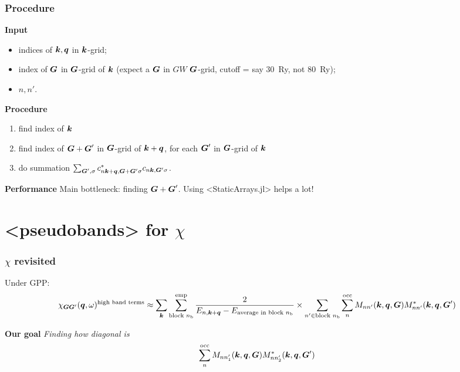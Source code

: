 \documentclass[t]{beamer}
\newcommand{\shortcode}[1]{\texttt{#1}}
\def\\{}%
\def\texttt#1{<#1>}%
\begin{document}
\begin{frame}
\frametitle{Procedure}

\textbf{Input} 
\begin{itemize}
    \item indices of $\vb*{k}, \vb*{q}$ in $\vb*{k}$-grid; 
    \item index of $\vb*{G}$ in $\vb*{G}$-grid of $\vb*{k}$ 
    (expect a $\vb*{G}$ in $GW$ $\vb*{G}$-grid, 
    cutoff = say \SI{30}{Ry}, not \SI{80}{Ry});
    \item $n, n'$.
\end{itemize}

\textbf{Procedure}
\begin{enumerate}
    \item find index of $\vb*{k}$
    \item find index of $\vb*{G} + \vb*{G}'$ in $\vb*{G}$-grid of $\vb*{k} + \vb*{q}$,
    for each $\vb*{G}'$ in $\vb*{G}$-grid of $\vb*{k}$
    \item do summation $\sum_{\vb*{G}', \sigma} c^*_{n \vb*{k} + \vb*{q}, \vb*{G} + \vb*{G}' \sigma} c_{n \vb*{k}, \vb*{G}' \sigma}$.
\end{enumerate}    

\vspace{0.5cm}

\textbf{Performance} Main bottleneck: finding $\vb*{G} + \vb*{G}'$.
Using \shortcode{StaticArrays.jl} helps a lot! 

\end{frame}

\section{\shortcode{pseudobands} for $\chi$}

\begin{frame}
\frametitle{$\chi$ revisited}

Under GPP:
\begin{equation}
    \begin{aligned}
        \chi_{\vb*{G} \vb*{G}'}(\vb*{q}, \omega)^{\text{high band terms}}
        \approx \sum_{\vb*{k}} \sum_{\text{block $n_{\text{b}}$}}^{\text{emp}} 
        \frac{
            2
        }{
            E_{n, \vb*{k} + \vb*{q}} - E_{\text{average in block $n_{\text{b}}$}} 
        } \\
        \times \sum_{n' \in \text{block $n_{\text{b}}$}} \sum_{n}^{\text{occ}} 
        M_{n n'} (\vb*{k}, \vb*{q}, \vb*{G}) M^*_{nn'} (\vb*{k}, \vb*{q}, \vb*{G}') 
    \end{aligned}
\end{equation}

\vspace{0.5cm}

\textbf{Our goal} \emph{Finding how diagonal is}
\begin{equation}
    \sum_{n}^{\text{occ}} 
        M_{n n'_1} (\vb*{k}, \vb*{q}, \vb*{G}) M^*_{nn'_2} (\vb*{k}, \vb*{q}, \vb*{G}') 
\end{equation}

\end{frame}
\end{document}
